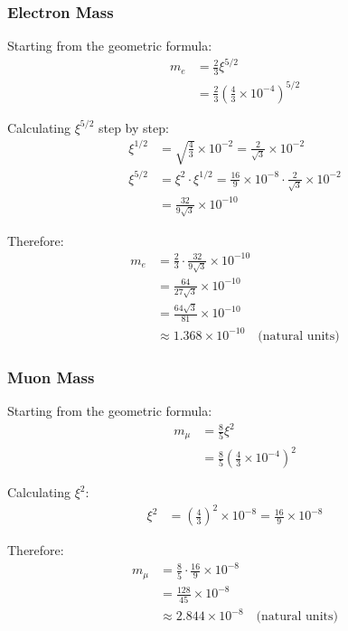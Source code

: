 \documentclass[12pt,a4paper]{article}
\newcommand{\xipar}{\xi}  %
\begin{document}
	\subsubsection{Electron Mass}
	
	\begin{keyresult}
		Starting from the geometric formula:
		\begin{align}
			m_e &= \frac{2}{3} \xipar^{5/2} \\
			&= \frac{2}{3} \left(\frac{4}{3} \times 10^{-4}\right)^{5/2}
		\end{align}
		
		Calculating $\xipar^{5/2}$ step by step:
		\begin{align}
			\xipar^{1/2} &= \sqrt{\frac{4}{3}} \times 10^{-2} = \frac{2}{\sqrt{3}} \times 10^{-2} \\
			\xipar^{5/2} &= \xipar^2 \cdot \xipar^{1/2} = \frac{16}{9} \times 10^{-8} \cdot \frac{2}{\sqrt{3}} \times 10^{-2} \\
			&= \frac{32}{9\sqrt{3}} \times 10^{-10}
		\end{align}
		
		Therefore:
		\begin{align}
			m_e &= \frac{2}{3} \cdot \frac{32}{9\sqrt{3}} \times 10^{-10} \\
			&= \frac{64}{27\sqrt{3}} \times 10^{-10} \\
			&= \frac{64\sqrt{3}}{81} \times 10^{-10} \\
			&\approx 1.368 \times 10^{-10} \quad \text{(natural units)}
		\end{align}
	\end{keyresult}
	
	\subsubsection{Muon Mass}
	
	\begin{keyresult}
		Starting from the geometric formula:
		\begin{align}
			m_\mu &= \frac{8}{5} \xipar^{2} \\
			&= \frac{8}{5} \left(\frac{4}{3} \times 10^{-4}\right)^{2}
		\end{align}
		
		Calculating $\xipar^{2}$:
		\begin{align}
			\xipar^{2} &= \left(\frac{4}{3}\right)^{2} \times 10^{-8} = \frac{16}{9} \times 10^{-8}
		\end{align}
		
		Therefore:
		\begin{align}
			m_\mu &= \frac{8}{5} \cdot \frac{16}{9} \times 10^{-8} \\
			&= \frac{128}{45} \times 10^{-8} \\
			&\approx 2.844 \times 10^{-8} \quad \text{(natural units)}
		\end{align}
	\end{keyresult}
	
\end{document}
